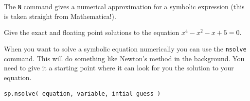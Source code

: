 The \texttt{N} command gives a numerical approximation for a symbolic expression (this is
taken straight from Mathematica!).

\begin{problem}
    Give the exact and floating point solutions to the equation $x^4 - x^2 - x + 5 = 0$.
\end{problem}


When you want to solve a symbolic equation numerically you can use the \texttt{nsolve}
command.  This will do something like Newton's method in the background.  You need to give
it a starting point where it can look for you the solution to your equation.  
\begin{lstlisting}
sp.nsolve( equation, variable, intial guess )
\end{lstlisting}

